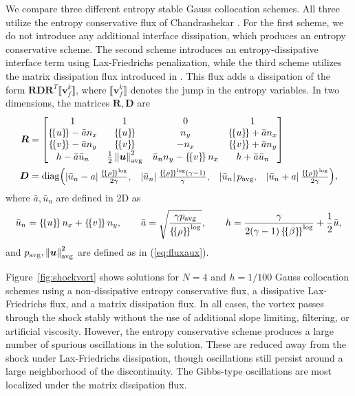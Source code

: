 \documentclass[onefignum,onetabnum,final]{siamart171218}
\newcommand{\nor}[1]{\left\| #1 \right\|}
\newcommand{\LRb}[1]{\left| #1 \right|}
\newcommand{\LRc}[1]{\left\{ #1 \right\}}
\newcommand{\jump}[1] {\ensuremath{\llbracket#1\rrbracket}}
\newcommand{\avg}[1] {\ensuremath{\LRc{\!\{#1\}\!}}}
\begin{document}
We compare three different entropy stable Gauss collocation schemes.  All three utilize the entropy conservative flux of Chandrashekar \cite{chandrashekar2013kinetic}.  For the first scheme, we do not introduce any additional interface dissipation, which produces an entropy conservative scheme.  The second scheme introduces an entropy-dissipative interface term using Lax-Friedrichs penalization, while the third scheme utilizes the matrix dissipation flux introduced in \cite{winters2017uniquely}.  This flux adds a dissipation of the form $\bm{R}\bm{D}\bm{R}^T\jump{{\bm{v}}^k_f}$, where $\jump{{\bm{v}}^k_f}$ denotes the jump in the entropy variables.  In two dimensions, the matrices $\bm{R}, \bm{D}$ are 
\begin{align*}
\bm{R} &= \begin{bmatrix}
1 & 1 & 0 & 1\\
\avg{u}-\bar{a} n_x & \avg{u} & n_y & \avg{u}+\bar{a} n_x\\
\avg{v}-\bar{a} n_y & \avg{v} & -n_x & \avg{v}+\bar{a} n_y\\
h-\bar{a} \bar{u}_n & \frac{1}{2}\nor{\bm{u}}^2_{\rm avg} & \bar{u}_n n_y - \avg{v}n_x & h + \bar{a} \bar{u}_n
\end{bmatrix}\\
\bm{D} &= {\rm diag}{\begin{pmatrix}
\LRb{\bar{u}_n - a}\frac{\avg{\rho}^{\log}}{2\gamma}, & \LRb{\bar{u}_n}\frac{\avg{\rho}^{\log}(\gamma-1)}{\gamma}, & \LRb{\bar{u}_n}p_{\rm avg}, & \LRb{\bar{u}_n + a}\frac{\avg{\rho}^{\log}}{2\gamma} \end{pmatrix}},
\end{align*}
where $\bar{a}, \bar{u}_n$ are defined in 2D as
\begin{gather*}
\bar{u}_n = \avg{u}n_x + \avg{v}n_y, \qquad \bar{a} = \sqrt{\frac{\gamma p_{\rm avg}}{\avg{\rho}^{\log}}}, \qquad h = \frac{\gamma}{2(\gamma-1)\avg{\beta}^{\log}} + \frac{1}{2}\bar{u}, 
\end{gather*}
and $p_{\rm avg}, \nor{\bm{u}}^2_{\rm avg}$ are defined as in (\ref{eq:fluxaux}).  

Figure~\ref{fig:shockvort} shows solutions for $N=4$ and $h = 1/100$ Gauss collocation schemes using a non-dissipative entropy conservative flux, a dissipative Lax-Friedrichs flux, and a matrix dissipation flux.  In all cases, the vortex passes through the shock stably without the use of additional slope limiting, filtering, or artificial viscosity.  However, the entropy conservative scheme produces a large number of spurious oscillations in the solution.  These are reduced away from the shock under Lax-Friedrichs dissipation, though oscillations still persist around a large neighborhood of the discontinuity.  The Gibbs-type oscillations are most localized under the matrix dissipation flux.  
\end{document}

